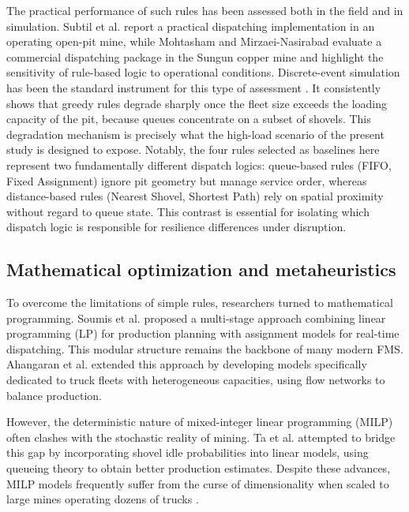 \documentclass[11pt,a4paper]{article}
\begin{document}
The practical performance of such rules has been assessed both in the field and in simulation. Subtil et al. \cite{Subtil2011} report a practical dispatching implementation in an operating open-pit mine, while Mohtasham and Mirzaei-Nasirabad \cite{MehrnazMohtasham2023} evaluate a commercial dispatching package in the Sungun copper mine and highlight the sensitivity of rule-based logic to operational conditions. Discrete-event simulation has been the standard instrument for this type of assessment \cite{NecmettinCetin2004, MarceloFioroni2008, Zeng2022, MiladAbolghasemian2020}. It consistently shows that greedy rules degrade sharply once the fleet size exceeds the loading capacity of the pit, because queues concentrate on a subset of shovels. This degradation mechanism is precisely what the high-load scenario of the present study is designed to expose. Notably, the four rules selected as baselines here represent two fundamentally different dispatch logics: queue-based rules (FIFO, Fixed Assignment) ignore pit geometry but manage service order, whereas distance-based rules (Nearest Shovel, Shortest Path) rely on spatial proximity without regard to queue state. This contrast is essential for isolating which dispatch logic is responsible for resilience differences under disruption.

\subsection{Mathematical optimization and metaheuristics}

To overcome the limitations of simple rules, researchers turned to mathematical programming. Soumis et al. \cite{Soumis1989} proposed a multi-stage approach combining linear programming (LP) for production planning with assignment models for real-time dispatching. This modular structure remains the backbone of many modern FMS. Ahangaran et al. \cite{Ahangaran2012} extended this approach by developing models specifically dedicated to truck fleets with heterogeneous capacities, using flow networks to balance production.

However, the deterministic nature of mixed-integer linear programming (MILP) often clashes with the stochastic reality of mining. Ta et al. \cite{ChungTa2013} attempted to bridge this gap by incorporating shovel idle probabilities into linear models, using queueing theory to obtain better production estimates. Despite these advances, MILP models frequently suffer from the curse of dimensionality when scaled to large mines operating dozens of trucks \cite{AmandaSmith2020, ZhongxinWang2022}.
\end{document}
